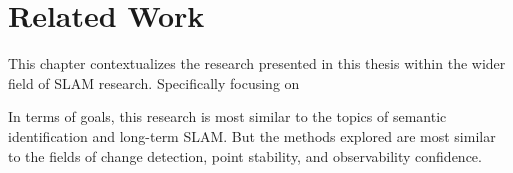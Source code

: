 \section{Related Work}
\label{sec:related_work}

This chapter contextualizes the research presented in this thesis within the wider field of SLAM research. Specifically focusing on 

In terms of goals, this research is most similar to the topics of semantic identification and long-term SLAM. But the methods explored are most similar to the fields of change detection, point stability, and observability confidence.

% 